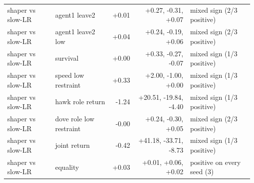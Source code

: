 \begin{tabular}{llrrl}
shaper vs slow-LR & agent1 leave2 & +0.01 & +0.27, -0.31, +0.07 & mixed sign (2/3 positive) \\
shaper vs slow-LR & agent1 leave2 low & +0.04 & +0.24, -0.19, +0.06 & mixed sign (2/3 positive) \\
shaper vs slow-LR & survival & +0.00 & +0.33, -0.27, -0.07 & mixed sign (1/3 positive) \\
shaper vs slow-LR & speed low restraint & +0.33 & +2.00, -1.00, +0.00 & mixed sign (1/3 positive) \\
shaper vs slow-LR & hawk role return & -1.24 & +20.51, -19.84, -4.40 & mixed sign (1/3 positive) \\
shaper vs slow-LR & dove role low restraint & -0.00 & +0.24, -0.30, +0.05 & mixed sign (2/3 positive) \\
shaper vs slow-LR & joint return & -0.42 & +41.18, -33.71, -8.73 & mixed sign (1/3 positive) \\
shaper vs slow-LR & equality & +0.03 & +0.01, +0.06, +0.02 & positive on every seed (3) \\
\bottomrule
\end{tabular}

